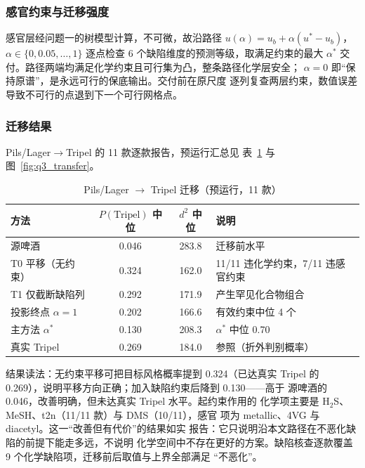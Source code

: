 \documentclass[12pt,a4paper]{article}
\begin{document}
\subsubsection{感官约束与迁移强度}

感官层经问题一的树模型计算，不可微，故沿路径
$u(\alpha)=u_b+\alpha(u^*-u_b)$，$\alpha\in\{0,0.05,\dots,1\}$
逐点检查 6 个缺陷维度的预测等级，取满足约束的最大 $\alpha^*$
交付。路径两端均满足化学约束且可行集为凸，整条路径化学层安全；
$\alpha=0$ 即``保持原谱''，是永远可行的保底输出。交付前在原尺度
逐列复查两层约束，数值误差导致不可行的点退到下一个可行网格点。

\subsubsection{迁移结果}

Pils/Lager$\to$Tripel 的 11 款逐款报告，预运行汇总见
表~\ref{tab:q3_transfer} 与图~\ref{fig:q3_transfer}。

\begin{table}[!htbp]
  \centering\small
  \caption{Pils/Lager $\to$ Tripel 迁移（预运行，11 款）}
  \label{tab:q3_transfer}
  \begin{tabular}{lccl}
    \toprule
    方法 & $P(\text{Tripel})$ 中位 & $d^2$ 中位 & 说明 \\
    \midrule
    源啤酒 & 0.046 & 283.8 & 迁移前水平 \\
    T0 平移（无约束） & 0.324 & 162.0 & 11/11 违化学约束，7/11 违感官约束 \\
    T1 仅截断缺陷列 & 0.292 & 171.9 & 产生罕见化合物组合 \\
    投影终点 $\alpha=1$ & 0.202 & 166.6 & 有效约束中位 4 个 \\
    主方法 $\alpha^*$ & 0.130 & 208.3 & $\alpha^*$ 中位 0.70 \\
    真实 Tripel & 0.269 & 184.0 & 参照（折外判别概率） \\
    \bottomrule
  \end{tabular}
\end{table}


结果读法：无约束平移可把目标风格概率提到 0.324（已达真实 Tripel
的 0.269），说明平移方向正确；加入缺陷约束后降到 0.130——高于
源啤酒的 0.046，改善明确，但未达真实 Tripel 水平。起约束作用的
化学项主要是 H$_2$S、MeSH、t2n（11/11 款）与 DMS（10/11），感官
项为 metallic、4VG 与 diacetyl。这一``改善但有代价''的结果如实
报告：它只说明沿本文路径在不恶化缺陷的前提下能走多远，不说明
化学空间中不存在更好的方案。缺陷核查逐款覆盖 9 个化学缺陷项，迁移前后取值与上界全部满足
``不恶化''。
\end{document}
